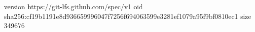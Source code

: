 version https://git-lfs.github.com/spec/v1
oid sha256:cf19b1191e8d936659996047f7256f694063599e3281ef1079a95f9bf0810ec1
size 349676
